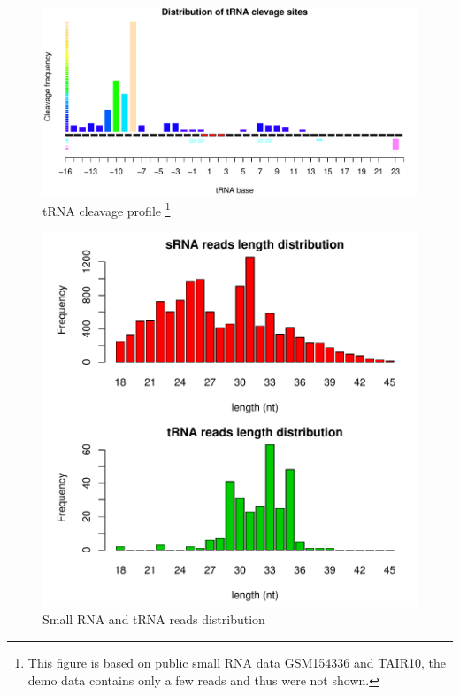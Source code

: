 \documentclass[11pt, a4paper]{article}
\begin{document}
\begin{figure}[htbp]
\begin{center}
\includegraphics[width=13cm]{cleavage_profile.pdf}
\caption[Caption for LOF]{tRNA cleavage profile \footnote{This figure is based on public small RNA data GSM154336 and TAIR10, the demo data contains only a few reads and thus were not shown.}}
\label{cleavage}
\end{center}
\end{figure}

\begin{figure}[htbp]
\begin{center}
\includegraphics[width=13cm]{distribution.pdf}
\caption{Small RNA and tRNA reads distribution}
\label{distribution}
\end{center}
\end{figure}
\end{document}
